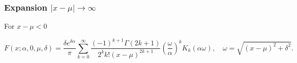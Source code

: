 \documentclass[10pt,a4paper,oneside]{article}
\numberwithin{equation}{section}
\begin{document}
\begin{table}[H]
	\centering
	\caption{Absolute error and bound \eqref{bound_remainder_xmu_b0_positive} estimating $N$ using \eqref{N_expansion_xmu_b0_positive} for the series expansion  \eqref{expansion_xmu_b0_positive} with machine-precision absolute error.}
	\label{table_bound_remainder_xmu_b0_positive_large_N}
\end{table}


\subsubsection{Expansion $|x-\mu| \to \infty$}
For $x - \mu < 0$

\begin{equation}
F(x; \alpha, 0, \mu, \delta) = \frac{\delta e^{\delta \alpha}}{\pi} \sum_{k=0}^{\infty}\frac{(-1)^{k+1}\Gamma(2k + 1)}{2^k k! (x-\mu)^{2k + 1}} \left(\frac{\omega}{\alpha}\right)^k K_k(\alpha \omega), \quad \omega = \sqrt{(x-\mu)^2 + \delta^2}.
\end{equation}
\end{document}
